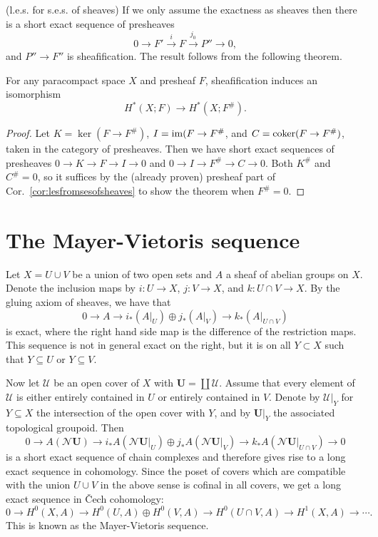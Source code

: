 \documentclass[a4paper,openany]{scrbook}
\newcommand{\nerve}{\mathcal N}
\begin{document}
(l.e.s. for s.e.s. of sheaves)
If we only assume the exactness as sheaves then there is a short exact sequence of presheaves
\[
0 \to F' \xrightarrow{i} F \xrightarrow{j_0} P'' \to 0,
\]
and $P'' \to F''$ is sheafification. The result follows from the following theorem.

\begin{thm}\label{thm:cohomologyinvariantundersheafification}
For any paracompact space $X$ and presheaf $F$, sheafification induces an isomorphism
\[
H^*(X;F) \to H^*(X;F^\#).
\]
\end{thm}
\begin{proof}
Let $K=\ker(F \to F^\#)$, $I = \operatorname{im}(F \to F^\#$, and $C = \operatorname{coker}(F \to F^\#)$, taken in the category of presheaves. Then we have short exact sequences of presheaves $0 \to K \to F \to I \to 0$ and $0 \to I \to F^\# \to C \to 0$. Both $K^\#$ and $C^\#=0$, so it suffices by the (already proven) presheaf part of Cor.~\ref{cor:lesfromsesofsheaves} to show the theorem when $F^\#=0$.

\end{proof}


\section{The Mayer-Vietoris sequence}

Let $X=U \cup V$ be a union of two open sets and $A$ a sheaf of abelian groups on $X$. Denote the inclusion maps by $i\colon U \to X$, $j\colon V \to X$, and $k\colon U \cap V \to X$. By the gluing axiom of sheaves, we have that
\[
0 \to A \to i_*(A|_U) \oplus j_*(A|_V) \to k_*(A|_{U \cap V})
\]
is exact, where the right hand side map is the difference of the restriction maps. This sequence is not in general exact on the right, but it is on all $Y \subset X$ such that $Y \subseteq U$ or $Y \subseteq V$.

Now let $\mathcal U$ be an open cover of $X$ with $\mathbf U = \coprod \mathcal U$. Assume that every element of $\mathcal U$ is either entirely contained in $U$ or entirely contained in $V$. Denote by $\mathcal U|_Y$ for $Y \subseteq X$ the intersection of the open cover with $Y$, and by $\mathbf U|_Y$ the associated topological groupoid. Then
\[
0 \to A(\nerve \mathbf U) \to i_*A(\nerve \mathbf U|_U) \oplus j_*A(\nerve \mathbf U|_V) \to k_*A(\nerve \mathbf U|_{U \cap V}) \to 0
\]
is a short exact sequence of chain complexes and therefore gives rise to a long exact sequence in cohomology. Since the poset of covers which are compatible with the union $U \cup V$ in the above sense is cofinal in all covers, we get a long exact sequence in \v Cech cohomology:
\[
0 \to H^0(X,A) \to H^0(U,A) \oplus H^0(V,A) \to H^0(U\cap V,A) \to H^1(X,A) \to \cdots.
\]
This is known as the Mayer-Vietoris sequence.
\end{document}
